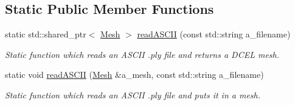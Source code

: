 \subsection*{Static Public Member Functions}
\begin{DoxyCompactItemize}
\item 
static std\+::shared\+\_\+ptr$<$ \hyperlink{classDcel_1_1Parser_1_1PLY_a047f135a59b43a0fb84f3629a790bba4}{Mesh} $>$ \hyperlink{classDcel_1_1Parser_1_1PLY_aaf13b770fe4d9cfc4e419af7418fc35c}{read\+A\+S\+C\+II} (const std\+::string a\+\_\+filename)
\begin{DoxyCompactList}\small\item\em Static function which reads an A\+S\+C\+II .ply file and returns a D\+C\+EL mesh. \end{DoxyCompactList}\item 
static void \hyperlink{classDcel_1_1Parser_1_1PLY_a280f083c1901248de1c69321783ad9d1}{read\+A\+S\+C\+II} (\hyperlink{classDcel_1_1Parser_1_1PLY_a047f135a59b43a0fb84f3629a790bba4}{Mesh} \&a\+\_\+mesh, const std\+::string a\+\_\+filename)
\begin{DoxyCompactList}\small\item\em Static function which reads an A\+S\+C\+II .ply file and puts it in a mesh. \end{DoxyCompactList}\end{DoxyCompactItemize}
